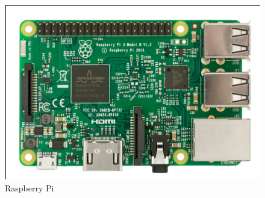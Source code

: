 \documentclass[12pt]{report}
\begin{document}
\begin{figure}[h]
    \centering
    \includegraphics[scale=.5]{Raspberrypi.png}
    \caption{Raspberry Pi}
    \label{fig:rpi}
\end{figure}
\end{document}
